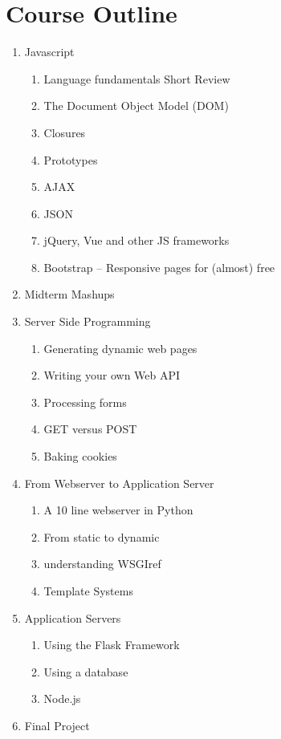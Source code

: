 \documentclass[11pt,twocolumn]{article}
\begin{document}
\section*{Course Outline}
\begin{enumerate}
	\addtolength{\itemsep}{-0.5\baselineskip}
	\item Javascript
	\begin{enumerate}
 		\item Language fundamentals Short Review
		\item The Document Object Model (DOM)
		\item Closures
		\item Prototypes
		\item AJAX
		\item JSON
		\item jQuery, Vue and other JS frameworks
        \item Bootstrap -- Responsive pages for (almost) free
	\end{enumerate}
	\item Midterm Mashups
	\item Server Side Programming
\begin{enumerate}
	\item Generating dynamic web pages
	\item Writing your own Web API
	\item Processing forms
	\item GET versus POST
	\item Baking cookies
\end{enumerate}
	\item From Webserver to Application Server
	\begin{enumerate}
		\item A 10 line webserver in Python
		\item From static to dynamic
		\item understanding WSGIref
		\item Template Systems
	\end{enumerate}
	\item Application Servers
	\begin{enumerate}
		\item Using the Flask Framework
		\item Using a database
		\item Node.js
	\end{enumerate}
	\item Final Project
\end{enumerate}
\end{document}

